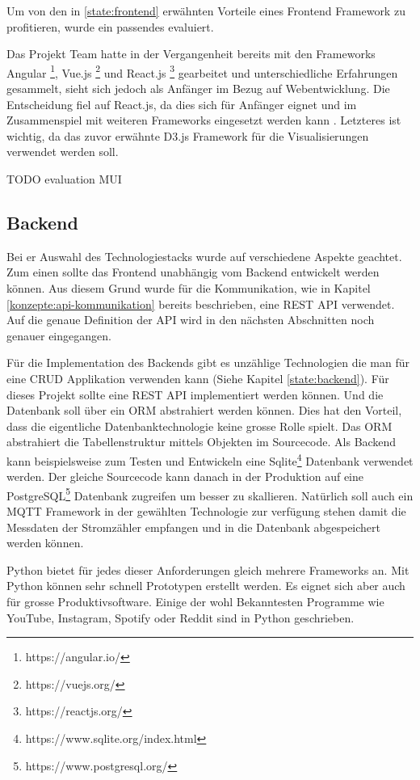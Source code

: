 Um von den in \ref{state:frontend} erwähnten Vorteile eines Frontend Framework zu profitieren,
wurde ein passendes evaluiert.

Das Projekt Team hatte in der Vergangenheit bereits mit den Frameworks Angular \footnote{https://angular.io/}, Vue.js \footnote{https://vuejs.org/} und React.js \footnote{https://reactjs.org/} gearbeitet
und unterschiedliche Erfahrungen gesammelt, sieht sich jedoch als Anfänger im Bezug auf Webentwicklung.
Die Entscheidung fiel auf React.js, da dies sich für Anfänger eignet und im Zusammenspiel mit weiteren Frameworks eingesetzt werden kann \parencite{react_angular_vue}.
Letzteres ist wichtig, da das zuvor erwähnte D3.js Framework für die Visualisierungen verwendet werden soll.

TODO evaluation MUI


\subsection{Backend}
Bei er Auswahl des Technologiestacks wurde auf verschiedene Aspekte geachtet.
Zum einen sollte das Frontend unabhängig vom Backend entwickelt werden können.
Aus diesem Grund wurde für die Kommunikation, wie in Kapitel \ref{konzepte:api-kommunikation}
bereits beschrieben, eine \ac{REST} \ac{API} verwendet.
Auf die genaue Definition der \ac{API} wird in den nächsten Abschnitten noch genauer eingegangen.

Für die Implementation des Backends gibt es unzählige Technologien die man für eine \ac{CRUD}
Applikation verwenden kann (Siehe Kapitel \ref{state:backend}). Für dieses Projekt sollte
eine \ac{REST} \ac{API} implementiert werden können. Und die Datenbank soll über ein \ac{ORM}
abstrahiert werden können. Dies hat den Vorteil, dass die eigentliche Datenbanktechnologie
keine grosse Rolle spielt. Das \ac{ORM} abstrahiert die Tabellenstruktur mittels
Objekten im Sourcecode. Als Backend kann beispielsweise zum Testen und Entwickeln
eine Sqlite\footnote{https://www.sqlite.org/index.html} Datenbank verwendet werden.
Der gleiche Sourcecode kann danach in der Produktion auf eine PostgreSQL\footnote{https://www.postgresql.org/}
Datenbank zugreifen um besser zu skallieren.
Natürlich soll auch ein \ac{MQTT} Framework in der gewählten Technologie zur verfügung stehen
damit die Messdaten der Stromzähler empfangen und in die Datenbank abgespeichert werden können.

Python bietet für jedes dieser Anforderungen gleich mehrere Frameworks an. Mit Python können sehr
schnell Prototypen erstellt werden. Es eignet sich aber auch für grosse Produktivsoftware.
Einige der wohl Bekanntesten Programme wie YouTube, Instagram, Spotify oder Reddit sind
in Python geschrieben. \cite{popular_python_sw}

